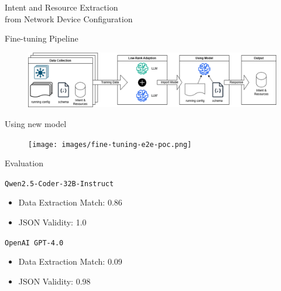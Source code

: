 \documentclass[aspectratio=169]{beamer}
\begin{document}
\begin{frame}{}

  \begin{center}
    \Huge \color[rgb]{1,1,1}Intent and Resource Extraction \\ from Network Device Configuration
  \end{center}

\end{frame}


\begin{frame}{Fine-tuning Pipeline}

      \begin{figure}
        \includegraphics[width = \textwidth]{images/fine-tuning-pipeline.png}
      \end{figure}

\end{frame}

\begin{frame}{Using new model}

  \begin{figure}
    \texttt{[image: images/fine-tuning-e2e-poc.png]}
  \end{figure}

\end{frame}

\begin{frame}{Evaluation}

  \texttt{Qwen2.5-Coder-32B-Instruct}

  \begin{itemize}
    \setlength\itemsep{1em}
    \item Data Extraction Match: 0.86
    \item JSON Validity: 1.0
  \end{itemize}

  \texttt{OpenAI GPT-4.0}
  \begin{itemize}
    \setlength\itemsep{1em}
    \item Data Extraction Match: 0.09
    \item JSON Validity: 0.98
  \end{itemize}

\end{frame}
\end{document}
